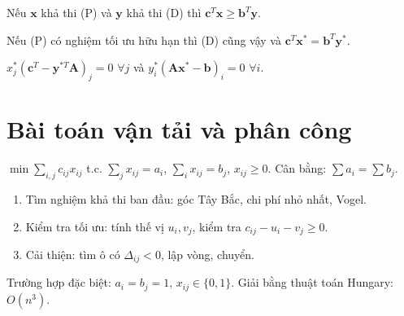 \documentclass[12pt,a4paper]{article}
\begin{document}
\begin{dinhly}[title={Đối ngẫu yếu}]
  Nếu $\mathbf{x}$ khả thi (P) và $\mathbf{y}$ khả thi (D) thì $\mathbf{c}^T\mathbf{x} \ge \mathbf{b}^T\mathbf{y}$.
\end{dinhly}

\begin{dinhly}[title={Đối ngẫu mạnh}]
  Nếu (P) có nghiệm tối ưu hữu hạn thì (D) cũng vậy và $\mathbf{c}^T\mathbf{x}^* = \mathbf{b}^T\mathbf{y}^*$.
\end{dinhly}

\begin{dinhly}[title={Bù lỏng (Complementary Slackness)}]
  $x_j^*(\mathbf{c}^T - \mathbf{y}^{*T}\mathbf{A})_j = 0$ $\forall j$ và $y_i^*(\mathbf{A}\mathbf{x}^* - \mathbf{b})_i = 0$ $\forall i$.
\end{dinhly}

\section{Bài toán vận tải và phân công}

\begin{dinhnghia}[title={Bài toán vận tải}]
  $\min \sum_{i,j} c_{ij}x_{ij}$ t.c. $\sum_j x_{ij} = a_i$, $\sum_i x_{ij} = b_j$, $x_{ij} \ge 0$. Cân bằng: $\sum a_i = \sum b_j$.
\end{dinhnghia}

\begin{phuongphap}[title={Giải bài toán vận tải}]
  \begin{enumerate}
    \item Tìm nghiệm khả thi ban đầu: góc Tây Bắc, chi phí nhỏ nhất, Vogel.
    \item Kiểm tra tối ưu: tính thế vị $u_i, v_j$, kiểm tra $c_{ij} - u_i - v_j \ge 0$.
    \item Cải thiện: tìm ô có $\Delta_{ij} < 0$, lập vòng, chuyển.
  \end{enumerate}
\end{phuongphap}

\begin{dinhnghia}[title={Bài toán phân công}]
  Trường hợp đặc biệt: $a_i = b_j = 1$, $x_{ij} \in \{0, 1\}$. Giải bằng thuật toán Hungary: $O(n^3)$.
\end{dinhnghia}
\end{document}
